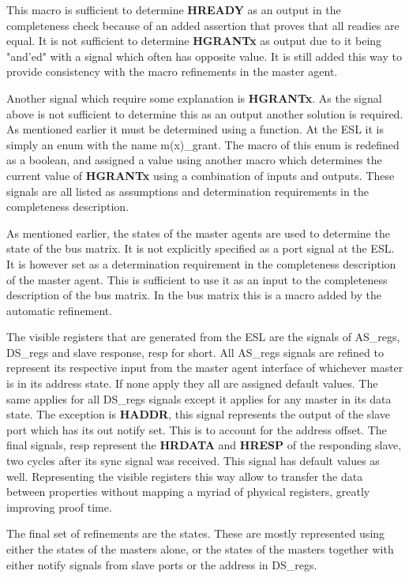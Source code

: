 This macro is sufficient to determine \textbf{HREADY} as an output in the completeness check because of an added assertion that proves that all readies
are equal. It is not sufficient to determine \textbf{HGRANTx} as output due to it being "and'ed" with a signal which often has opposite value. It is still added this way to provide consistency with the macro refinements in the master agent. \par
Another signal which require some explanation is \textbf{HGRANTx}. As the signal above is not sufficient to determine this as an output another solution is required. As mentioned earlier it must be determined using a function. At the ESL it is simply an enum with the name m(x)\_grant. The macro of this enum
is redefined as a boolean, and assigned a value using another macro which determines the current value of \textbf{HGRANTx} using a combination of inputs
and outputs. These signals are all listed as assumptions and determination requirements in the completeness description. \par
As mentioned earlier, the states of the master agents are used to determine the state of the bus matrix. It is not explicitly specified as a port signal at the
ESL. It is however set as a determination requirement in the completeness description of the master agent. This is sufficient to use it as an input to the
completeness description of the bus matrix. In the bus matrix this is a macro added by the automatic refinement. \par
The visible registers that are generated from the ESL are the signals of AS\_regs, DS\_regs and slave response, resp for short. All AS\_regs signals are refined
to represent its respective input from the master agent interface of whichever master is in its address state. If none apply they all are assigned default values. The same applies for all DS\_regs signals except it applies for any master in its data state. The exception is \textbf{HADDR}, this signal represents the output of the slave port which has its out notify set. This is to account for the address offset. The final signals, resp represent the \textbf{HRDATA} and \textbf{HRESP} of the responding slave, two cycles after its sync signal was received. This signal has default values as well. Representing the visible registers this way allow to transfer the data between properties without mapping a myriad of physical registers, greatly improving proof time. \par
The final set of refinements are the states. These are mostly represented using either the states of the masters alone, or the states of the masters together with either notify signals from slave ports or the address in DS\_regs. 


